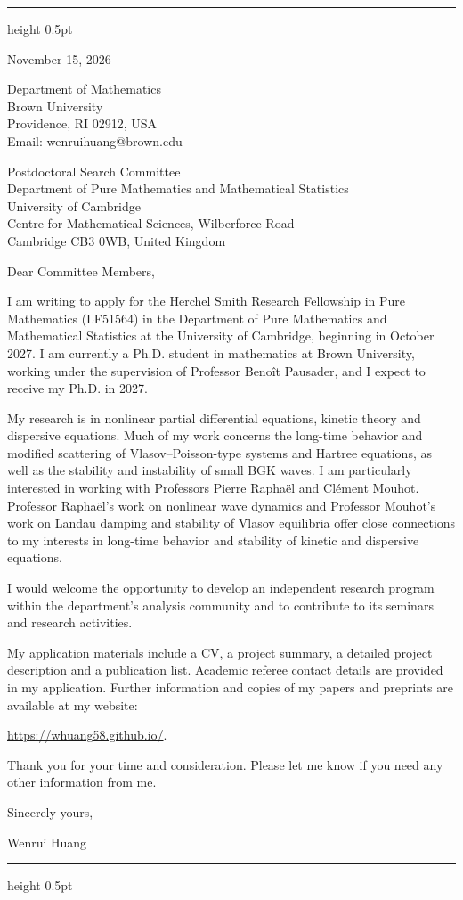 \documentclass[10pt]{article}
\begin{document}
\vspace{0.08in}
\hrule height 0.5pt

\vspace{0.47in}
\hfill
\begin{minipage}{2.27in}
November 15, 2026

\vspace{0.16in}
Department of Mathematics\\
Brown University\\
Providence, RI 02912, USA\\
Email: wenrui\textunderscore huang@brown.edu
\end{minipage}

\vspace{0.30in}
Postdoctoral Search Committee\\
Department of Pure Mathematics and Mathematical Statistics\\
University of Cambridge\\
Centre for Mathematical Sciences, Wilberforce Road\\
Cambridge CB3 0WB, United Kingdom

\vspace{0.16in}
Dear Committee Members,

I am writing to apply for the Herchel Smith Research Fellowship in Pure Mathematics (LF51564) in the Department of Pure Mathematics and Mathematical Statistics at the University of Cambridge, beginning in October 2027. I am currently a Ph.D. student in mathematics at Brown University, working under the supervision of Professor Beno\^{i}t Pausader, and I expect to receive my Ph.D. in 2027.

My research is in nonlinear partial differential equations, kinetic theory and dispersive equations. Much of my work concerns the long-time behavior and modified scattering of Vlasov--Poisson-type systems and Hartree equations, as well as the stability and instability of small BGK waves. I am particularly interested in working with Professors Pierre Rapha\"{e}l and Cl\'{e}ment Mouhot. Professor Rapha\"{e}l's work on nonlinear wave dynamics and Professor Mouhot's work on Landau damping and stability of Vlasov equilibria offer close connections to my interests in long-time behavior and stability of kinetic and dispersive equations.

I would welcome the opportunity to develop an independent research program within the department's analysis community and to contribute to its seminars and research activities.

My application materials include a CV, a project summary, a detailed project description and a publication list. Academic referee contact details are provided in my application. Further information and copies of my papers and preprints are available at my website:

\url{https://whuang58.github.io/}.

\medskip
Thank you for your time and consideration. Please let me know if you need any other information from me.

\vspace{0.12in}
Sincerely yours,

\vspace{0.12in}
Wenrui Huang

\vfill
\hrule height 0.5pt
\end{document}
